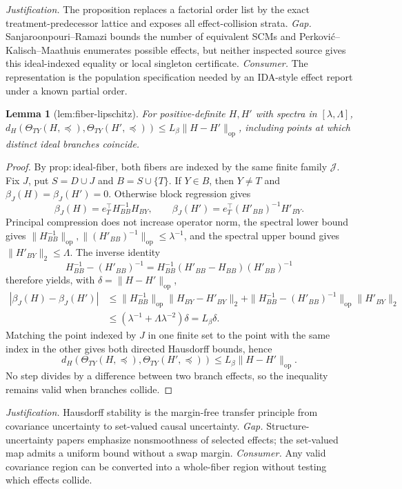 \documentclass{article}
\newtheorem{lemma}{Lemma}
\begin{document}
\par\smallskip\noindent \textit{Justification.} The proposition replaces a factorial order list by the exact treatment-predecessor lattice and exposes all effect-collision strata. \textit{Gap.} Sanjaroonpouri--Ramazi bounds the number of equivalent SCMs and Perkovi\'c--Kalisch--Maathuis enumerates possible effects, but neither inspected source gives this ideal-indexed equality or local singleton certificate. \textit{Consumer.} The representation is the population specification needed by an IDA-style effect report under a known partial order.

\begin{lemma}[lem:fiber-lipschitz]\label{lem:fiber-lipschitz}
For positive-definite \(H,H'\) with spectra in \([\lambda,\Lambda]\), \(d_H(\Theta_{TY}(H,\preceq),\Theta_{TY}(H',\preceq))\le L_\beta\|H-H'\|_{\mathrm{op}}\), including points at which distinct ideal branches coincide.
\end{lemma}
\begin{proof}
By \(\mathrm{prop:ideal\text{-}fiber}\), both fibers are indexed by the same finite family \(\mathcal J\).  Fix \(J\), put \(S=D\cup J\) and \(B=S\cup\{T\}\).  If \(Y\in B\), then \(Y\ne T\) and \(\beta_J(H)=\beta_J(H')=0\).  Otherwise block regression gives
\[
 \beta_J(H)=e_T^{\top}H_{BB}^{-1}H_{BY},\qquad
 \beta_J(H')=e_T^{\top}(H'_{BB})^{-1}H'_{BY}.
\]
Principal compression does not increase operator norm, the spectral lower bound gives \(\|H_{BB}^{-1}\|_{\mathrm{op}},\|(H'_{BB})^{-1}\|_{\mathrm{op}}\le\lambda^{-1}\), and the spectral upper bound gives \(\|H'_{BY}\|_2\le\Lambda\).  The inverse identity
\[
 H_{BB}^{-1}-(H'_{BB})^{-1}
 =H_{BB}^{-1}(H'_{BB}-H_{BB})(H'_{BB})^{-1}
\]
therefore yields, with \(\delta=\|H-H'\|_{\mathrm{op}}\),
\[
 \begin{aligned}
 |\beta_J(H)-\beta_J(H')|
 &\le \|H_{BB}^{-1}\|_{\mathrm{op}}\|H_{BY}-H'_{BY}\|_2
 +\|H_{BB}^{-1}-(H'_{BB})^{-1}\|_{\mathrm{op}}\|H'_{BY}\|_2\\
 &\le (\lambda^{-1}+\Lambda\lambda^{-2})\delta=L_\beta\delta.
 \end{aligned}
\]
Matching the point indexed by \(J\) in one finite set to the point with the same index in the other gives both directed Hausdorff bounds, hence
\[
 d_H(\Theta_{TY}(H,\preceq),\Theta_{TY}(H',\preceq))
 \le L_\beta\|H-H'\|_{\mathrm{op}}.
\]
No step divides by a difference between two branch effects, so the inequality remains valid when branches collide.
\end{proof}
\par\smallskip\noindent \textit{Justification.} Hausdorff stability is the margin-free transfer principle from covariance uncertainty to set-valued causal uncertainty. \textit{Gap.} Structure-uncertainty papers emphasize nonsmoothness of selected effects; the set-valued map admits a uniform bound without a swap margin. \textit{Consumer.} Any valid covariance region can be converted into a whole-fiber region without testing which effects collide.
\end{document}
